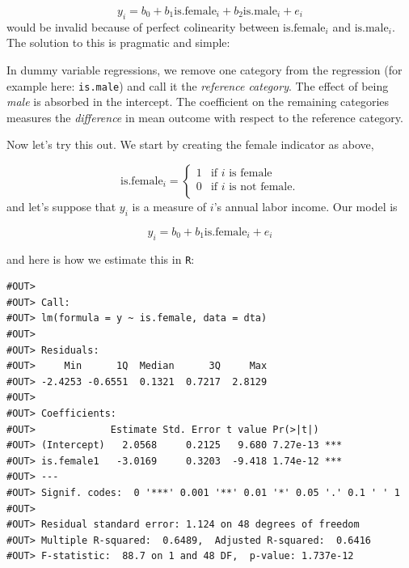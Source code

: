 \documentclass[]{book}
\newenvironment{Shaded}{\begin{snugshade}}{\end{snugshade}}
\newcommand{\KeywordTok}[1]{\textcolor[rgb]{0.13,0.29,0.53}{\textbf{#1}}}
\newcommand{\StringTok}[1]{\textcolor[rgb]{0.31,0.60,0.02}{#1}}
\newcommand{\CommentTok}[1]{\textcolor[rgb]{0.56,0.35,0.01}{\textit{#1}}}
\newcommand{\OperatorTok}[1]{\textcolor[rgb]{0.81,0.36,0.00}{\textbf{#1}}}
\newcommand{\NormalTok}[1]{#1}
\newenvironment{tip}{\begin{tcolorbox}[colback=green!5!white,colframe=green]}{\end{tcolorbox}}
\begin{document}
\[
y_i = b_0 + b_1 \text{is.female}_i + b_2 \text{is.male}_i + e_i
\] would be invalid because of perfect colinearity between
\(\text{is.female}_i\) and \(\text{is.male}_i\). The solution to this is
pragmatic and simple:

\begin{tip}
In dummy variable regressions, we remove one category from the
regression (for example here: \texttt{is.male}) and call it the
\emph{reference category}. The effect of being \emph{male} is absorbed
in the intercept. The coefficient on the remaining categories measures
the \emph{difference} in mean outcome with respect to the reference
category.
\end{tip}

Now let's try this out. We start by creating the female indicator as
above,

\[
\text{is.female}_i = \begin{cases}
          1 & \text{if }i\text{ is female} \\
            0 & \text{if }i\text{ is not female}. \\
   \end{cases}
\] and let's suppose that \(y_i\) is a measure of \(i\)'s annual labor
income. Our model is

\begin{equation}
y_i = b_0 + b_1 \text{is.female}_i + e_i \label{eq:dummy-reg}
\end{equation}

and here is how we estimate this in \texttt{R}:

\begin{Shaded}
\end{Shaded}

\begin{verbatim}
#OUT> 
#OUT> Call:
#OUT> lm(formula = y ~ is.female, data = dta)
#OUT> 
#OUT> Residuals:
#OUT>     Min      1Q  Median      3Q     Max 
#OUT> -2.4253 -0.6551  0.1321  0.7217  2.8129 
#OUT> 
#OUT> Coefficients:
#OUT>             Estimate Std. Error t value Pr(>|t|)    
#OUT> (Intercept)   2.0568     0.2125   9.680 7.27e-13 ***
#OUT> is.female1   -3.0169     0.3203  -9.418 1.74e-12 ***
#OUT> ---
#OUT> Signif. codes:  0 '***' 0.001 '**' 0.01 '*' 0.05 '.' 0.1 ' ' 1
#OUT> 
#OUT> Residual standard error: 1.124 on 48 degrees of freedom
#OUT> Multiple R-squared:  0.6489,  Adjusted R-squared:  0.6416 
#OUT> F-statistic:  88.7 on 1 and 48 DF,  p-value: 1.737e-12
\end{verbatim}
\end{document}
